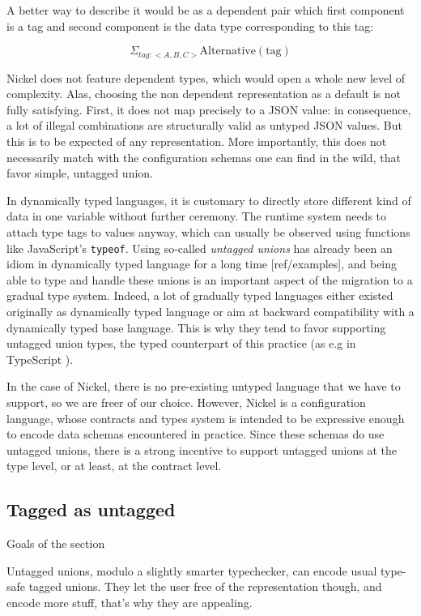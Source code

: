 \documentclass{article}
\begin{document}
A better way to describe it would be as a dependent pair which first component
is a tag and second component is the data type corresponding to this tag:

\[
    \Sigma_{tag : <A, B, C>} \text{Alternative}(\text{tag})
\]

Nickel does not feature dependent types, which would open a whole new level of
complexity. Alas, choosing the non dependent representation as a default is not
fully satisfying.  First, it does not map precisely to a JSON value: in
consequence, a lot of illegal combinations are structurally valid as untyped
JSON values. But this is to be expected of any representation. More importantly,
this does not necessarily match with the configuration schemas one can find in
the wild, that favor simple, untagged union.

In dynamically typed languages, it is customary to directly store different kind
of data in one variable without further ceremony. The runtime system needs to
attach type tags to values anyway, which can usually be observed using functions
like JavaScript's \verb+typeof+. Using so-called \emph{untagged unions} has
already been an idiom in dynamically typed language for a long time
[ref/examples], and being able to type and handle these unions is an important
aspect of the migration to a gradual type system. Indeed, a lot of gradually
typed languages either existed originally as dynamically typed language or aim
at backward compatibility with a dynamically typed base language. This is why
they tend to favor supporting untagged union types, the typed counterpart of
this practice (as e.g in TypeScript \cite{TypeScriptUnions}).

In the case of Nickel, there is no pre-existing untyped language that we have to
support, so we are freer of our choice. However, Nickel is a configuration
language, whose contracts and types system is intended to be expressive enough
to encode data schemas encountered in practice. Since these schemas do use
untagged unions, there is a strong incentive to support untagged unions at the
type level, or at least, at the contract level.

\subsection{Tagged as untagged}
\color{red}Goals of the section

Untagged unions, modulo a slightly smarter typechecker, can encode usual type-safe
tagged unions. They let the user free of the representation though, and encode
more stuff, that's why they are appealing.\vspace{0.5cm}\color{black}
\end{document}
